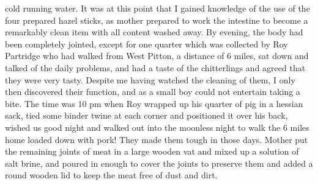 cold running water. It was at this point that I gained knowledge of the use of
the four prepared hazel sticks, as mother prepared to work the intestine to
become a remarkably clean item with all content washed away. By evening, the
body had been completely jointed, except for one quarter which was collected by
Roy Partridge who had walked from West Pitton, a distance of 6 miles, sat down
and talked of the daily problems, and had a taste of the chitterlings and
agreed that they were very tasty. Despite me having watched the cleaning of
them, I only then discovered their function, and as a small boy could not
entertain taking a bite. The time was 10 pm when Roy wrapped up his quarter of
pig in a hessian sack, tied some binder twine at each corner and positioned it
over his back, wished us good night and walked out into the moonless night to
walk the 6 miles home loaded down with pork! They made them tough in those
days. Mother put the remaining joints of meat in a large wooden vat and mixed
up a solution of salt brine, and poured in enough to cover the joints to
preserve them and added a round wooden lid to keep the meat free of dust and
dirt.

